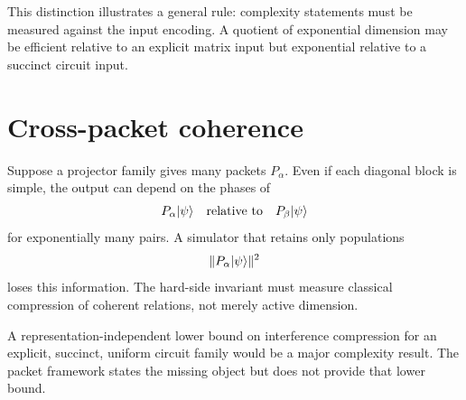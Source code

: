 This distinction illustrates a general rule: complexity statements must be measured against the input encoding. A quotient of exponential dimension may be efficient relative to an explicit matrix input but exponential relative to a succinct circuit input.

\section{Cross-packet coherence}
Suppose a projector family gives many packets $P_\alpha$. Even if each diagonal block is simple, the output can depend on the phases of
\[
P_\alpha\lvert \psi\rangle
\quad\text{relative to}\quad
P_\beta\lvert \psi\rangle
\]
for exponentially many pairs. A simulator that retains only populations
\[
\|P_\alpha\lvert \psi\rangle\|^2
\]
loses this information. The hard-side invariant must measure classical compression of coherent relations, not merely active dimension.

\begin{frontierbox}
A representation-independent lower bound on interference compression for an explicit, succinct, uniform circuit family would be a major complexity result. The packet framework states the missing object but does not provide that lower bound.
\end{frontierbox}
